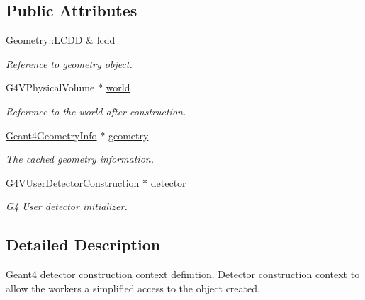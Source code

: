 \subsection*{Public Attributes}
\begin{DoxyCompactItemize}
\item 
\hyperlink{class_d_d4hep_1_1_geometry_1_1_l_c_d_d}{Geometry::LCDD} \& \hyperlink{class_d_d4hep_1_1_simulation_1_1_geant4_detector_construction_context_a39ab0e51872f7ce4974d7f1784af251e}{lcdd}
\begin{DoxyCompactList}\small\item\em Reference to geometry object. \item\end{DoxyCompactList}\item 
G4VPhysicalVolume $\ast$ \hyperlink{class_d_d4hep_1_1_simulation_1_1_geant4_detector_construction_context_a532857c4548770776adf8f94db5e5e56}{world}
\begin{DoxyCompactList}\small\item\em Reference to the world after construction. \item\end{DoxyCompactList}\item 
\hyperlink{class_d_d4hep_1_1_simulation_1_1_geant4_geometry_info}{Geant4GeometryInfo} $\ast$ \hyperlink{class_d_d4hep_1_1_simulation_1_1_geant4_detector_construction_context_a6da3039365bc44c54314ff0d51cfc655}{geometry}
\begin{DoxyCompactList}\small\item\em The cached geometry information. \item\end{DoxyCompactList}\item 
\hyperlink{class_g4_v_user_detector_construction}{G4VUserDetectorConstruction} $\ast$ \hyperlink{class_d_d4hep_1_1_simulation_1_1_geant4_detector_construction_context_a0fc040cea931da95d99ec7d3aca2199d}{detector}
\begin{DoxyCompactList}\small\item\em G4 User detector initializer. \item\end{DoxyCompactList}\end{DoxyCompactItemize}


\subsection{Detailed Description}
Geant4 detector construction context definition. Detector construction context to allow the workers a simplified access to the object created.

